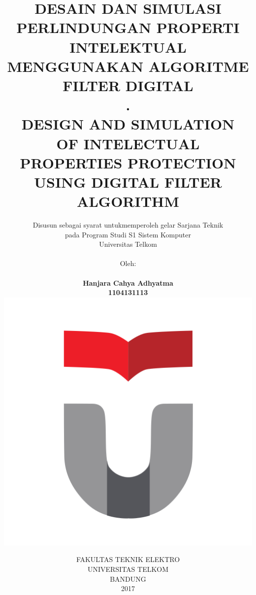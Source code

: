 \documentclass[a4paper,12pt,oneside]{book}
\newcommand\blankpage{%
	\null
	\thispagestyle{empty}%
	\addtocounter{page}{-1}%
	\newpage}
\begin{document}
\title{\tfont DESAIN DAN SIMULASI\\
	PERLINDUNGAN PROPERTI INTELEKTUAL\\
	MENGGUNAKAN ALGORITME FILTER DIGITAL\\.\\	
	DESIGN AND SIMULATION\\
	OF INTELECTUAL PROPERTIES PROTECTION\\
	USING DIGITAL FILTER ALGORITHM
}
\author{
	Disusun sebagai syarat untukmemperoleh gelar Sarjana Teknik\\
	pada Program Studi S1 Sistem Komputer\\
	Universitas Telkom\\\\
	Oleh:\\\\
	\textbf{Hanjara Cahya Adhyatma}\\
	\textbf{1104131113}\\
	\includegraphics[scale=0.13]{logo}
}

\date{
	FAKULTAS TEKNIK ELEKTRO\\
	UNIVERSITAS TELKOM\\
	BANDUNG\\
	2017}
\maketitle
%
\tableofcontents
\listoffigures
\listoftables

\addtocounter{page}{-3}





\end{document}
